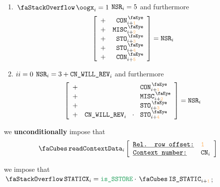 \begin{description}
\begin{enumerate}
\[\begin{array}{cr}
						+ & \peekContext _{i + \locFirstCon        } \\
						+ & \peekMisc    _{i + \locSstorexMisc     } \\
						+ & \peekContext _{i + \locSstorexSecondCon} \\
					\end{array} \right]
					=
					\nonStackRows_{i}
				\]
			\item \If $\stackOogx_{i} = 1$ \Then $\texttt{NSR}_{i} = 5$ and furthermore
				\[
					\left[ \begin{array}{cr}
						+ & \peekContext  _{i + \locFirstCon        } \\
						+ & \peekMisc     _{i + \locOogxMisc        } \\
						+ & \peekStorage  _{i + \locOogxDoStorage   } \\
						+ & \peekStorage  _{i + \locOogxUndoStorage } \\
						+ & \peekContext  _{i + \locOogxSecondCon   } \\
					\end{array} \right]
					=
					\nonStackRows_{i}
				\]
			\item \If $\xAhoy_{i} = 0$ \Then $\texttt{NSR}_{i} = 3 + \texttt{CN}\texttt{\_WILL\_REV}_{i}$ and furthermore
				\[
					\left[ \begin{array}{crcl}
						+ &                 &                   & \peekContext _{i + \locFirstCon           } \\
						+ &                 &                   & \peekMisc    _{i + \locMiscRowOffset      } \\
						+ &                 &                   & \peekStorage _{i + \locFirstStoRowOffset  } \\
						+ & \cnWillRev _{i} & \!\!\!\cdot\!\!\! & \peekStorage _{i + \locSecondStoRowOffset } \\
					\end{array} \right]
					=
					\nonStackRows_{i}
				\]
		\end{enumerate}
		\item[\underline{The first context-row:}]
			we \textbf{unconditionally} impose that
			\[
				\readContextData {i}{\locFirstCon}{\cn_{i}}
			\]
	\item[\underline{Setting \stackStaticx{} flag:}]
		we impose that
		$\stackStaticx_{i} = \locIsSstore \cdot \cnStatic_{i + \locFirstCon}$;


\end{description}
